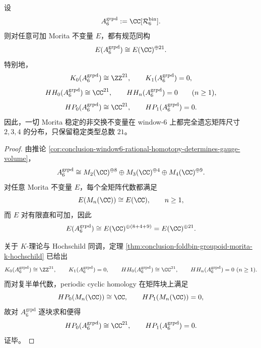 \begin{theorem}\label{thm:conclusion-window6-groupoid-algebra-morita-collapse}
设
\[
A_6^{\mathrm{grpd}}:=\CC[\mathcal R_6^{\mathrm{bin}}].
\]
则对任意可加 Morita 不变量 \(E\)，都有规范同构
\[
E(A_6^{\mathrm{grpd}})\cong E(\CC)^{\oplus 21}.
\]
特别地，
\[
K_0(A_6^{\mathrm{grpd}})\cong \ZZ^{21},
\qquad
K_1(A_6^{\mathrm{grpd}})=0,
\]
\[
HH_0(A_6^{\mathrm{grpd}})\cong \CC^{21},
\qquad
HH_n(A_6^{\mathrm{grpd}})=0
\qquad (n\ge 1),
\]
\[
HP_0(A_6^{\mathrm{grpd}})\cong \CC^{21},
\qquad
HP_1(A_6^{\mathrm{grpd}})=0.
\]
因此，一切 Morita 稳定的非交换不变量在 window-\(6\) 上都完全遗忘矩阵尺寸 \(2,3,4\) 的分布，只保留稳定类型总数 \(21\)。
\end{theorem}
\begin{proof}
由推论 \ref{cor:conclusion-window6-rational-homotopy-determines-gauge-volume}，
\[
A_6^{\mathrm{grpd}}\cong M_2(\CC)^{\oplus 8}\oplus M_3(\CC)^{\oplus 4}\oplus M_4(\CC)^{\oplus 9}.
\]
对任意 Morita 不变量 \(E\)，每个全矩阵代数都满足
\[
E(M_n(\CC))\cong E(\CC),
\qquad n\ge 1,
\]
而 \(E\) 对有限直和可加，因此
\[
E(A_6^{\mathrm{grpd}})
\cong
E(\CC)^{\oplus(8+4+9)}
=
E(\CC)^{\oplus 21}.
\]

关于 \(K\)-理论与 Hochschild 同调，定理
\ref{thm:conclusion-foldbin-groupoid-morita-k-hochschild}
已给出
\[
K_0(A_6^{\mathrm{grpd}})\cong \ZZ^{21},
\qquad
K_1(A_6^{\mathrm{grpd}})=0,
\qquad
HH_0(A_6^{\mathrm{grpd}})\cong \CC^{21},
\qquad
HH_n(A_6^{\mathrm{grpd}})=0\ (n\ge 1).
\]
而对复半单代数，periodic cyclic homology 在矩阵块上满足
\[
HP_0(M_n(\CC))\cong \CC,
\qquad
HP_1(M_n(\CC))=0,
\]
故对 \(A_6^{\mathrm{grpd}}\) 逐块求和便得
\[
HP_0(A_6^{\mathrm{grpd}})\cong \CC^{21},
\qquad
HP_1(A_6^{\mathrm{grpd}})=0.
\]
证毕。
\end{proof}

